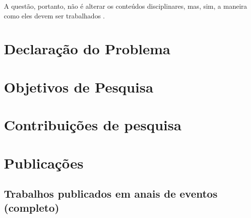 A questão, portanto, não é alterar os conteúdos disciplinares, mas, sim, a maneira como eles devem ser trabalhados \citep{valente_tecnologia_2018}.

\section{Declaração do Problema}

\section{Objetivos de Pesquisa}


\section{Contribuições de pesquisa}


\section{Publicações}

\subsection{Trabalhos publicados em anais de eventos (completo)}


